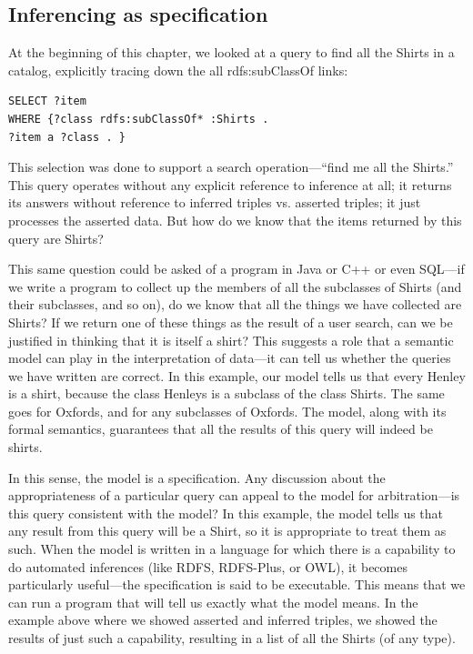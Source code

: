 \subsection{Inferencing as specification}

At the beginning of this chapter, we looked at a query to find all the
Shirts in a catalog, explicitly tracing down the all rdfs:subClassOf
links:

\begin{lstlisting}
SELECT ?item
WHERE {?class rdfs:subClassOf* :Shirts .
?item a ?class . }
\end{lstlisting}

This selection was done to support a search operation---``find me all
the Shirts.'' This query operates without any explicit reference to
inference at all; it returns its answers without reference to inferred
triples vs. asserted triples; it just processes the asserted data. But
how do we know that the items returned by this query are Shirts?

This same question could be asked of a program in Java or C++ or even
SQL---if we write a program to collect up the members of all the
subclasses of Shirts (and their subclasses, and so on), do we know that
all the things we have collected are Shirts? If we return one of these
things as the result of a user search, can we be justified in thinking
that it is itself a shirt? This suggests a role that a semantic model
can play in the interpretation of data---it can tell us whether the
queries we have written are correct. In this example, our model tells us
that every Henley is a shirt, because the class Henleys is a subclass of
the class Shirts. The same goes for Oxfords, and for any subclasses of
Oxfords. The model, along with its formal semantics, guarantees that all
the results of this query will indeed be shirts.

In this sense, the model is a specification. Any discussion about the
appropriateness of a particular query can appeal to the model for
arbitration---is this query consistent with the model? In this example,
the model tells us that any result from this query will be a Shirt, so
it is appropriate to treat them as such. When the model is written in a
language for which there is a capability to do automated inferences
(like RDFS, RDFS-Plus, or OWL), it becomes particularly useful---the
specification is said to be executable. This means that we can run a
program that will tell us exactly what the model means. In the example
above where we showed asserted and inferred triples, we showed the
results of just such a capability, resulting in a list of all the Shirts
(of any type).

